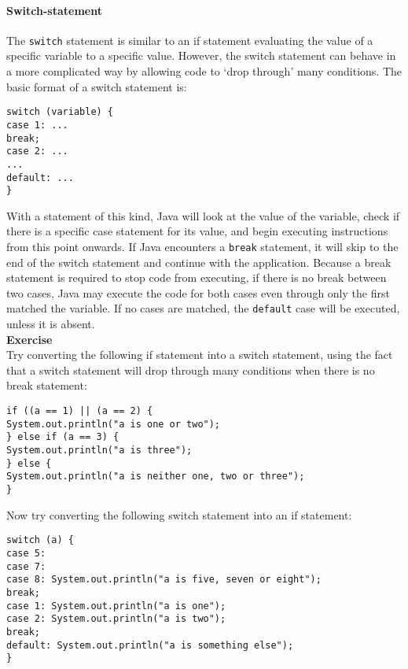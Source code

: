 \paragraph{Switch-statement}

The {\tt switch} statement is similar to an if statement evaluating the value of a specific variable to a specific value. However, the switch statement can behave in a more complicated way by allowing code to `drop through' many conditions. The basic format of a switch statement is:

\begin{verbatim}
switch (variable) {
case 1: ...
break;
case 2: ...
...
default: ...
}
\end{verbatim}

\noindent
With a statement of this kind, Java will look at the value of the variable, check if there is a specific case statement for its value, and begin executing instructions from this point onwards. If Java encounters a {\tt break} statement, it will skip to the end of the switch statement and continue with the application. Because a break statement is required to stop code from executing, if there is no break between two cases, Java may execute the code for both cases even through only the first matched the variable. If no cases are matched, the {\tt default} case will be executed, unless it is absent.\\

\noindent
{\bf Exercise}\\

\noindent
Try converting the following if statement into a switch statement, using the fact that a switch statement will drop through many conditions when there is no break statement:

\begin{verbatim}
if ((a == 1) || (a == 2) {
System.out.println("a is one or two");
} else if (a == 3) {
System.out.println("a is three");
} else {
System.out.println("a is neither one, two or three");
}
\end{verbatim}

\noindent
Now try converting the following switch statement into an if statement:

\begin{verbatim}
switch (a) {
case 5:
case 7:
case 8: System.out.println("a is five, seven or eight");
break;
case 1: System.out.println("a is one");
case 2: System.out.println("a is two");
break;
default: System.out.println("a is something else");
}
\end{verbatim}

